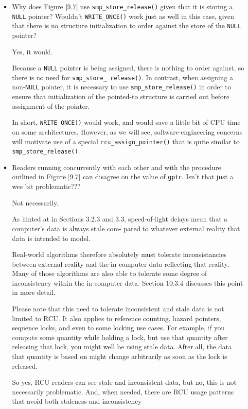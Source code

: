\documentclass[11pt]{article}
\begin{document}
\begin{remark}[]
\begin{itemize}
\item Why does Figure \ref{9.7} use \texttt{smp\_store\_release()} given that it is storing a \texttt{NULL} pointer? Wouldn’t
\texttt{WRITE\_ONCE()} work just as well in this case, given that there is no structure initialization to
order against the store of the \texttt{NULL} pointer?

Yes, it would.

Because a \texttt{NULL} pointer is being assigned, there is nothing to order against, so there is no need for
\texttt{smp\_store\_ release()}. In contrast, when assigning a non-\texttt{NULL} pointer, it is necessary to use
\texttt{smp\_store\_release()} in order to ensure that initialization of the pointed-to structure is carried
out before assignment of the pointer.

In short, \texttt{WRITE\_ONCE()} would work, and would save a little bit of CPU time on some architectures.
However, as we will see, software-engineering concerns will motivate use of a special
\texttt{rcu\_assign\_pointer()} that is quite similar to \texttt{smp\_store\_release()}.
\item Readers running concurrently with each other and with the procedure outlined in Figure \ref{9.7} can
disagree on the value of \texttt{gptr}. Isn’t that just a wee bit problematic???

Not necessarily.

As hinted at in Sections 3.2.3 and 3.3, speed-of-light delays mean that a computer’s data is always stale com- pared to whatever external reality that data is intended to model.

Real-world algorithms therefore absolutely must tolerate inconsistancies between external reality
and the in-computer data reflecting that reality. Many of those algorithms are also able to tolerate
some degree of inconsistency within the in-computer data. Section 10.3.4 discusses this point in
more detail.

Please note that this need to tolerate inconsistent and stale data is not limited to RCU. It also
applies to reference counting, hazard pointers, sequence locks, and even to some locking use cases.
For example, if you compute some quantity while holding a lock, but use that quantity after
releasing that lock, you might well be using stale data. After all, the data that quantity is based
on might change arbitrarily as soon as the lock is released.

So yes, RCU readers can see stale and inconsistent data, but no, this is not necessarily
problematic. And, when needed, there are RCU usage patterns that avoid both staleness and
inconsistency
\end{itemize}
\end{remark}
\end{document}

